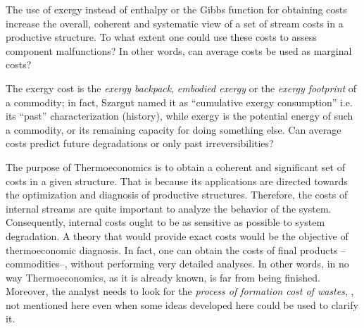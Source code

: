 \documentclass[energies,article,submit,moreauthors,pdftex]{Definitions/mdpi}
\begin{document}
The use of exergy instead of enthalpy or the Gibbs function for obtaining costs increase the overall, coherent and systematic view of a set of stream costs in a productive structure. To what extent one could use these costs to assess component malfunctions? In other words, can average costs be used as marginal costs?

The exergy cost is the \emph{exergy backpack}, \emph{embodied exergy} or the \emph{exergy footprint} of a commodity; in fact, Szargut named it as “cumulative exergy consumption” i.e. its “past” characterization (history), while exergy is the potential energy of such a commodity, or its remaining capacity for doing something else. Can average costs predict future degradations or only past irreversibilities? 

The purpose of Thermoeconomics is to obtain a coherent and significant set of costs in a given structure. That is because its applications are directed towards the optimization and diagnosis of productive structures. Therefore, the costs of internal streams are quite important to analyze the behavior of the system. Consequently, internal costs ought to be as sensitive as possible to system degradation. A theory that would provide exact costs would be the objective of thermoeconomic diagnosis. In fact, one can obtain the costs of final products --commodities--, without performing very detailed analyses. In other words, in no way Thermoeconomics, as it is already known, is far from being finished. Moreover, the analyst needs to look for the \emph{process of formation cost of wastes}, \cite{Torres2008}, not mentioned here even when some ideas developed here could be used to clarify it.
\end{document}
